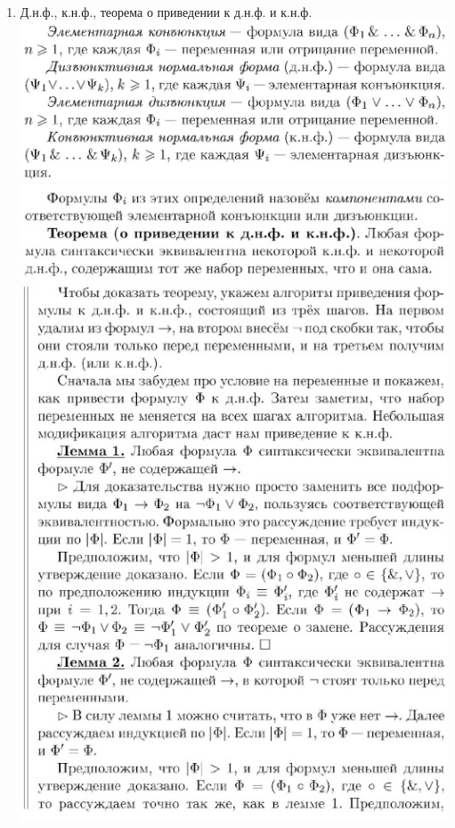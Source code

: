 \documentclass[a4paper]{article}
\theoremstyle{definition}
\begin{document}
\begin{enumerate}
\begin{proof}
       \end{proof}
 \item Д.н.ф., к.н.ф., теорема о приведении к д.н.ф. и к.н.ф.
       \mbox{}\\ \includegraphics[scale=0.45]{36_1.jpg}\\
       \includegraphics[scale=0.93]{36_2.jpg}\\

\end{enumerate}
\end{document}
